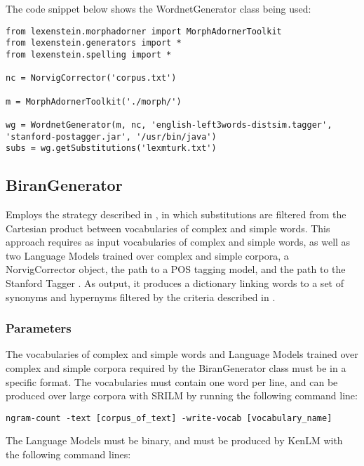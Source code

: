 The code snippet below shows the WordnetGenerator class being used:

\begin{lstlisting}
from lexenstein.morphadorner import MorphAdornerToolkit
from lexenstein.generators import *
from lexenstein.spelling import *

nc = NorvigCorrector('corpus.txt')

m = MorphAdornerToolkit('./morph/')

wg = WordnetGenerator(m, nc, 'english-left3words-distsim.tagger', 'stanford-postagger.jar', '/usr/bin/java')
subs = wg.getSubstitutions('lexmturk.txt')
\end{lstlisting}









\subsection{BiranGenerator}

Employs the strategy described in \cite{Biran2011}, in which substitutions are filtered from the Cartesian product between vocabularies of complex and simple words. This approach requires as input vocabularies of complex and simple words, as well as two Language Models trained over complex and simple corpora, a NorvigCorrector object, the path to a POS tagging model, and the path to the Stanford Tagger \cite{Klein1965}. As output, it produces a dictionary linking words to a set of synonyms and hypernyms filtered by the criteria described in \cite{Biran2011}.

\subsubsection{Parameters}

The vocabularies of complex and simple words and Language Models trained over complex and simple corpora required by the BiranGenerator class must be in a specific format. The vocabularies must contain one word per line, and can be produced over large corpora with SRILM by running the following command line:

\begin{lstlisting}
ngram-count -text [corpus_of_text] -write-vocab [vocabulary_name]
\end{lstlisting}

The Language Models must be binary, and must be produced by KenLM with the following command lines:

